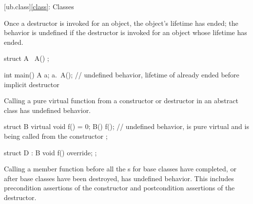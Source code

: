 [ub.class]{\ref*{class}: Classes}


\pnum
Once a destructor is invoked for an object,
the object's lifetime has ended;
the behavior is undefined if the
destructor is invoked for an object whose lifetime has ended.

\pnum
\begin{example}
\begin{codeblock}
struct A {
  ~A() {}
};

int main() {
  A a;
  a.~A();
}   // undefined behavior, lifetime of  already ended before implicit destructor
\end{codeblock}
\end{example}


\pnum
Calling a pure virtual function from a constructor or destructor
in an abstract class has undefined behavior.

\pnum
\begin{example}
\begin{codeblock}
struct B {
  virtual void f() = 0;
  B() {
    f();        // undefined behavior,  is pure virtual and is being called from the constructor
  }
};

struct D : B {
  void f() override;
};
\end{codeblock}
\end{example}


\pnum
Calling a member function
before all the s
for base classes have completed,
or after base classes have been destroyed,
has undefined behavior.
This includes precondition assertions of the constructor
and postcondition assertions of the destructor.


